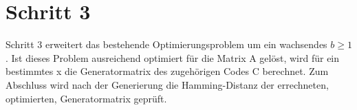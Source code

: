\section{Schritt 3}
Schritt 3 erweitert das bestehende Optimierungsproblem  um ein wachsendes $b\geq 1$. Ist dieses Problem ausreichend optimiert für die Matrix A gelöst, wird für ein bestimmtes x die Generatormatrix des zugehörigen Codes C berechnet.  Zum Abschluss wird nach der Generierung die Hamming-Distanz der errechneten, optimierten, Generatormatrix geprüft.

